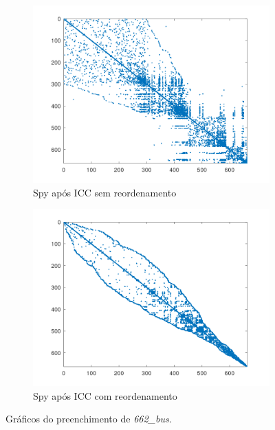 \begin{figure}[H]
    \par\bigskip
    \begin{subfigure}[t]{0.4\linewidth}
         \centering
         \includegraphics[width=\textwidth]{images/662_bus_spyM_ICC_sem.png}
         \caption{Spy após ICC sem reordenamento}
         \label{fig:bus-icc-s}
    \end{subfigure}
    \quad
    \begin{subfigure}[t]{0.4\linewidth}
         \centering
         \includegraphics[width=\textwidth]{images/662_bus_spyM_ICC_com.png}
         \caption{Spy após ICC com reordenamento}
         \label{fig:bus-icc-c}
    \end{subfigure}
    \caption{Gráficos do preenchimento de \textit{662\_bus}.}
    \label{fig:bus}
\end{figure}
